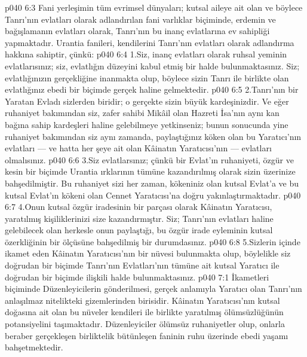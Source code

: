 \vs p040 6:3 Fani yerleşimin tüm evrimsel dünyaları; kutsal aileye ait olan ve böylece Tanrı’nın evlatları olarak adlandırılan fani varlıklar biçiminde, erdemin ve bağışlamanın evlatları olarak, Tanrı’nın bu inanç evlatlarına ev sahipliği yapmaktadır. Urantia fanileri, kendilerini Tanrı’nın evlatları olarak adlandırma hakkına sahiptir, çünkü:
\vs p040 6:4 1.\bibnobreakspace Siz, inanç evlatları olarak ruhsal yeminin evlatlarısınız; siz, evlatlığın düzeyini kabul etmiş bir halde bulunmaktasınız. Siz; evlatlığınızın gerçekliğine inanmakta olup, böylece sizin Tanrı ile birlikte olan evlatlığınız ebedi bir biçimde gerçek haline gelmektedir.
\vs p040 6:5 2.\bibnobreakspace Tanrı’nın bir Yaratan Evladı sizlerden biridir; o gerçekte sizin büyük kardeşinizdir. Ve eğer ruhaniyet bakımından siz, zafer sahibi Mikâil olan Hazreti İsa’nın aynı kan bağına sahip kardeşleri haline gelebilmeye yetkinseniz; bunun sonucunda yine ruhaniyet bakımından siz aynı zamanda, paylaştığınız köken olan bu Yaratıcı’nın evlatları --- ve hatta her şeye ait olan Kâinatın Yaratıcısı’nın --- evlatları olmalısınız.
\vs p040 6:6 3.\bibnobreakspace Siz evlatlarsınız; çünkü bir Evlat’ın ruhaniyeti, özgür ve kesin bir biçimde Urantia ırklarının tümüne kazandırılmış olarak sizin üzerinize bahşedilmiştir. Bu ruhaniyet sizi her zaman, kökeniniz olan kutsal Evlat’a ve bu kutsal Evlat’ın kökeni olan Cennet Yaratıcısı’na doğru yakınlaştırmaktadır.
\vs p040 6:7 4.\bibnobreakspace Onun kutsal özgür iradesinin bir parçası olarak Kâinatın Yaratıcısı, yaratılmış kişiliklerinizi size kazandırmıştır. Siz; Tanrı’nın evlatları haline gelebilecek olan herkesle onun paylaştığı, bu özgür irade eyleminin kutsal özerkliğinin bir ölçüsüne bahşedilmiş bir durumdasınız.
\vs p040 6:8 5.\bibnobreakspace Sizlerin içinde ikamet eden Kâinatın Yaratıcısı’nın bir nüvesi bulunmakta olup, böylelikle siz doğrudan bir biçimde Tanrı’nın Evlatları’nın tümüne ait kutsal Yaratıcı ile doğrudan bir biçimde ilişkili halde bulunmaktasınız.
\vs p040 7:1 İkametleri biçiminde Düzenleyicilerin gönderilmesi, gerçek anlamıyla Yaratıcı olan Tanrı’nın anlaşılmaz nitelikteki gizemlerinden birisidir. Kâinatın Yaratıcısı’nın kutsal doğasına ait olan bu nüveler kendileri ile birlikte yaratılmış ölümsüzlüğünün potansiyelini taşımaktadır. Düzenleyiciler ölümsüz ruhaniyetler olup, onlarla beraber gerçekleşen birliktelik bütünleşen faninin ruhu üzerinde ebedi yaşamı bahşetmektedir.
